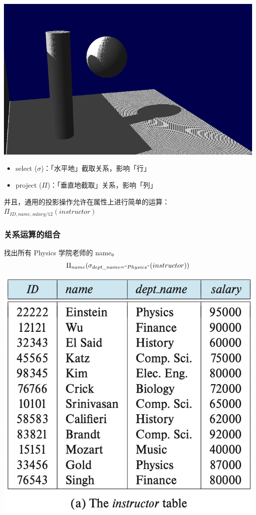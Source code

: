 \documentclass[aspectratio=169, 14pt]{beamer}
\begin{document}
\begin{frame}
    \begin{center}
        \includegraphics[width=.45\textwidth]{image/project}
    \end{center}

\begin{itemize}
    \item select ($\sigma$)：「水平地」截取关系，影响「行」
    \item project ($\Pi$)：「垂直地截取」关系，影响「列」
\end{itemize}
\pause
并且，通用的投影操作允许在属性上进行简单的运算：\large{\(\Pi_{ID, name, salary/12}(instructor)\)}
    
\end{frame}

\begin{frame}
    \frametitle{关系运算的组合}
    找出所有 Physics 学院老师的 name。
    {\large \[\Pi_{name}(\sigma_{dept\_name=``Physics"}(instructor))\]}
    \begin{center}
        \includegraphics[width=.55\textwidth, trim={0 4.4cm 0 0},clip]{table/instructor} 
    \end{center}

\end{frame}
\end{document}
